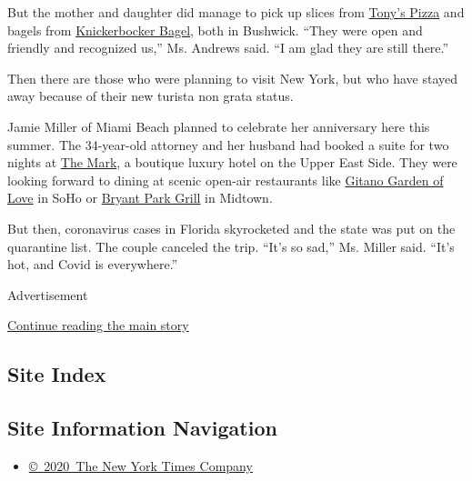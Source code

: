 But the mother and daughter did manage to pick up slices from
\href{https://originaltonysofbushwick.com/}{Tony's Pizza} and bagels
from \href{http://www.kbbagel.com/}{Knickerbocker Bagel}, both in
Bushwick. ``They were open and friendly and recognized us,'' Ms. Andrews
said. ``I am glad they are still there.''

Then there are those who were planning to visit New York, but who have
stayed away because of their new turista non grata status.

Jamie Miller of Miami Beach planned to celebrate her anniversary here
this summer. The 34-year-old attorney and her husband had booked a suite
for two nights at
\href{https://www.themarkhotel.com/?gclid=EAIaIQobChMIrKP4jvDu6gIVFaSzCh3SdAsCEAAYASAAEgJM-vD_BwE}{The
Mark}, a boutique luxury hotel on the Upper East Side. They were looking
forward to dining at scenic open-air restaurants like
\href{https://grupogitano.com/}{Gitano Garden of Love} in SoHo or
\href{https://bryantparkgrillnyc.com/}{Bryant Park Grill} in Midtown.

But then, coronavirus cases in Florida skyrocketed and the state was put
on the quarantine list. The couple canceled the trip. ``It's so sad,''
Ms. Miller said. ``It's hot, and Covid is everywhere.''

Advertisement

\protect\hyperlink{after-bottom}{Continue reading the main story}

\hypertarget{site-index}{%
\subsection{Site Index}\label{site-index}}

\hypertarget{site-information-navigation}{%
\subsection{Site Information
Navigation}\label{site-information-navigation}}

\begin{itemize}
\tightlist
\item
  \href{https://help.nytimes.com/hc/en-us/articles/115014792127-Copyright-notice}{©~2020~The
  New York Times Company}
\end{itemize}

